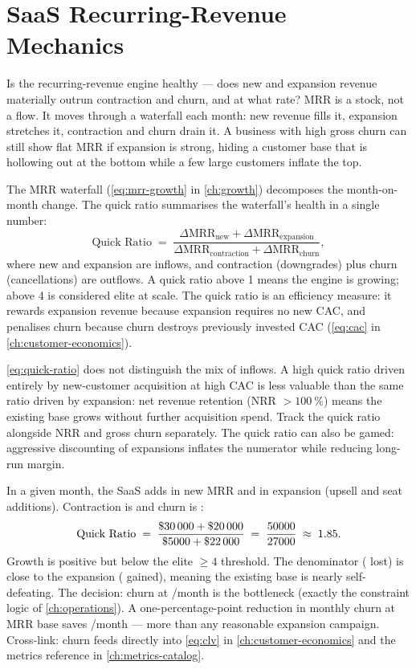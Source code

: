 \section{SaaS Recurring-Revenue Mechanics}\label{sec:saas-mrr}

Is the recurring-revenue engine healthy --- does new and expansion revenue materially outrun contraction and churn, and at what rate? MRR is a stock, not a flow. It moves through a waterfall each month: new revenue fills it, expansion stretches it, contraction and churn drain it. A business with high gross churn can still show flat MRR if expansion is strong, hiding a customer base that is hollowing out at the bottom while a few large customers inflate the top.

The MRR waterfall (\cref{eq:mrr-growth} in \cref{ch:growth}) decomposes the month-on-month change. The quick ratio summarises the waterfall's health in a single number:
\begin{equation}\label{eq:quick-ratio}
  \text{Quick Ratio} \;=\; \frac{\Delta\text{MRR}_{\text{new}} + \Delta\text{MRR}_{\text{expansion}}}{\Delta\text{MRR}_{\text{contraction}} + \Delta\text{MRR}_{\text{churn}}},
\end{equation}
where new and expansion are inflows, and contraction (downgrades) plus churn (cancellations) are outflows. A quick ratio above 1 means the engine is growing; above 4 is considered elite at scale. The quick ratio is an efficiency measure: it rewards expansion revenue because expansion requires no new CAC, and penalises churn because churn destroys previously invested CAC (\cref{eq:cac} in \cref{ch:customer-economics}).

\cref{eq:quick-ratio} does not distinguish the mix of inflows. A high quick ratio driven entirely by new-customer acquisition at high CAC is less valuable than the same ratio driven by expansion: net revenue retention (NRR $> \qty{100}{\percent}$) means the existing base grows without further acquisition spend. Track the quick ratio alongside NRR and gross churn separately. The quick ratio can also be gamed: aggressive discounting of expansions inflates the numerator while reducing long-run margin.

\begin{example}
In a given month, the SaaS adds  in new MRR and  in expansion (upsell and seat additions). Contraction is  and churn is :
\[
  \text{Quick Ratio} \;=\; \frac{\$\num{30000}+\$\num{20000}}{\$\num{5000}+\$\num{22000}}
    \;=\; \frac{50000}{27000} \;\approx\; 1.85.
\]
Growth is positive but below the elite \(\ge 4\) threshold. The denominator ( lost) is close to the expansion ( gained), meaning the existing base is nearly self-defeating. The decision: churn at /month is the bottleneck (exactly the constraint logic of \cref{ch:operations}). A one-percentage-point reduction in monthly churn at  MRR base saves /month --- more than any reasonable expansion campaign. Cross-link: churn feeds directly into \cref{eq:clv} in \cref{ch:customer-economics} and the metrics reference in \cref{ch:metrics-catalog}.
\end{example}

